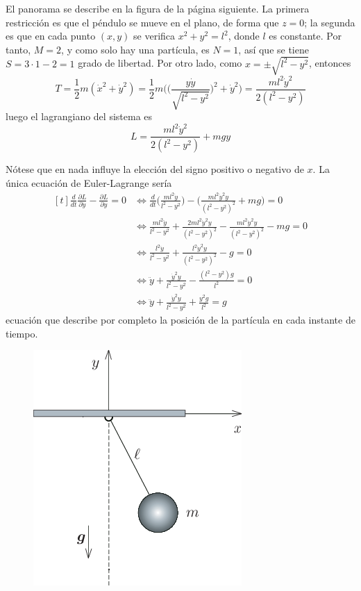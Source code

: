 \documentclass[12pt]{report}
\begin{document}
\begin{example} El panorama se describe en la figura de la página siguiente. La primera restricción es que el péndulo se mueve en el plano, de forma que $z = 0$; la segunda es que en cada punto $(x,y)$ se verifica $x^2+y^2 = l^2$, donde $l$ es constante. Por tanto, $M = 2$, y como solo hay una partícula, es $N = 1$, así que se tiene $S = 3 \cdot 1 - 2 = 1$ grado de libertad. Por otro lado, como $x = \pm \sqrt{l^2-y^2}$, entonces
\[T = \frac{1}{2}m(\dot{x}^2+\dot{y}^2) = \frac{1}{2}m\biggl(\biggl(\frac{y\dot{y}}{\sqrt{l^2-y^2}}\biggr)^2+\dot{y}^2\biggr) = \frac{ml^2\dot{y}^2}{2(l^2-y^2)}\]
luego el lagrangiano del sistema es
\[L = \frac{ml^2\dot{y}^2}{2(l^2-y^2)} + mgy\]

Nótese que en nada influye la elección del signo positivo o negativo de $x$. La única ecuación de Euler-Lagrange sería
\[
\begin{aligned}[t]
\frac{d}{dt}\frac{\partial L}{\partial \dot{y}}-\frac{\partial L}{\partial y} = 0 &\iff \frac{d}{dt}\biggl(\frac{ml^2\dot{y}}{l^2-y^2}\biggr)-\biggl(\frac{ml^2\dot{y}^2y}{(l^2-y^2)^2}+mg \biggr) = 0 \\
&\iff \frac{ml^2\ddot{y}}{l^2-y^2}+\frac{2ml^2\dot{y}^2y}{(l^2-y^2)^2} -\frac{ml^2\dot{y}^2y}{(l^2-y^2)^2}-mg = 0 \\
&\iff \frac{l^2\ddot{y}}{l^2-y^2}+\frac{l^2\dot{y}^2y}{(l^2-y^2)^2}-g=0 \\
&\iff \ddot{y}+\frac{\dot{y}^2y}{l^2-y^2}-\frac{(l^2-y^2)g}{l^2}=0 \\
&\iff \ddot{y}+\frac{\dot{y}^2y}{l^2-y^2}+\frac{y^2g}{l^2}=g
\end{aligned}
\]
ecuación que describe por completo la posición de la partícula en cada instante de tiempo.

\begin{figure}[h]
\includegraphics[scale = 0.6]{2.2_1}
\centering
\end{figure}


\end{example}
\end{document}

